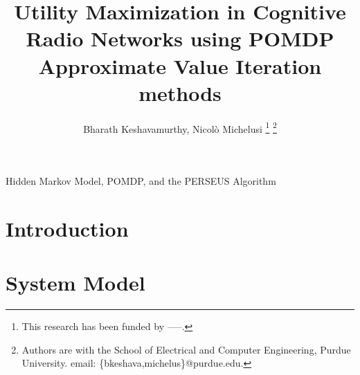 \documentclass[conference]{IEEEtran}
\begin{document}
\title{Utility Maximization in Cognitive Radio Networks using POMDP Approximate Value Iteration methods}

\author{Bharath Keshavamurthy, Nicol\`{o} Michelusi
\thanks{This research has been funded by -----.}
\thanks{Authors are with the School of Electrical and Computer Engineering, Purdue University. email: \{bkeshava,michelus\}@purdue.edu.}
}

\maketitle

\begin{abstract}
\end{abstract}

\begin{IEEEkeywords}
Hidden Markov Model, POMDP, and the PERSEUS Algorithm
\end{IEEEkeywords}

\section{Introduction}
\section{System Model}
\end{document}
